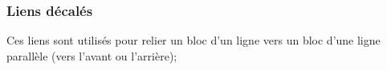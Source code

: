\documentclass[a4paper,11pt]{article}                      %
\begin{document}
\subsubsection{Liens décalés}
Ces liens sont utilisés pour relier un bloc d'un ligne vers un bloc d'une ligne parallèle (vers l'avant ou l'arrière);

\begin{center}
\end{center}
\end{document}
